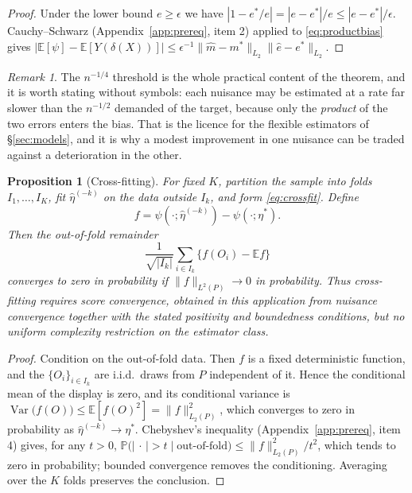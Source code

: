 \documentclass[11pt,a4paper]{article}
\theoremstyle{plain}
\newtheorem{proposition}[theorem]{Proposition}
\theoremstyle{definition}
\theoremstyle{remark}
\newtheorem*{remark*}{Remark}
\DeclareMathOperator{\Var}{Var}
\newcommand{\E}{\mathbb E}
\newcommand{\Prob}{\mathbb P}
\begin{document}
\begin{proof}
Under the lower bound $e\ge\epsilon$ we have $|1-e^\ast/e|=|e-e^\ast|/e\le|e-e^\ast|/\epsilon$.
Cauchy--Schwarz (Appendix~\ref{app:prereq}, item 2) applied to \eqref{eq:productbias} gives
$|\E[\psi]-\E[Y(\delta(X))]|\le\epsilon^{-1}\|\hat m-m^\ast\|_{L_2}\|\hat e-e^\ast\|_{L_2}$.
\end{proof}

\begin{remark*}
The $n^{-1/4}$ threshold is the whole practical content of the theorem, and it is worth stating
without symbols: each nuisance may be estimated at a rate far slower than the $n^{-1/2}$ demanded
of the target, because only the \emph{product} of the two errors enters the bias. That is the
licence for the flexible estimators of \S\ref{sec:models}, and it is why a modest improvement in
one nuisance can be traded against a deterioration in the other.
\end{remark*}

\begin{proposition}[Cross-fitting]\label{prop:crossfit}
For fixed $K$, partition the sample into folds $I_1,\dots,I_K$, fit $\hat\eta^{(-k)}$ on the
data outside $I_k$, and form \eqref{eq:crossfit}. Define
\[
f=\psi(\mathord\cdot;\hat\eta^{(-k)})-\psi(\mathord\cdot;\eta^\ast).
\]
Then the out-of-fold remainder
\[
\frac{1}{\sqrt{|I_k|}}\sum_{i\in I_k}\bigl\{f(O_i)-\E f\bigr\}
\]
converges to zero in probability if $\|f\|_{L^2(P)}\to0$ in probability. Thus cross-fitting
requires score convergence, obtained in
this application from nuisance convergence together with the stated positivity and boundedness
conditions, but no uniform complexity restriction on the estimator class.
\end{proposition}

\begin{proof}
Condition on the out-of-fold data. Then $f$ is a fixed deterministic function, and the
$\{O_i\}_{i\in I_k}$ are i.i.d.\ draws from $P$ independent of it. Hence the conditional mean of
the display is zero, and its conditional variance is
$\Var\bigl(f(O)\bigr)\le\E[f(O)^2]=\|f\|_{L_2(P)}^2$, which converges to zero in probability as
$\hat\eta^{(-k)}\to\eta^\ast$. Chebyshev's inequality (Appendix~\ref{app:prereq}, item 4) gives,
for any $t>0$, $\Prob\bigl(|\,\cdot\,|>t\mid\text{out-of-fold}\bigr)\le\|f\|^2_{L_2(P)}/t^2$,
which tends to zero in probability; bounded convergence removes the conditioning. Averaging over
the $K$ folds preserves the conclusion.
\end{proof}
\end{document}
